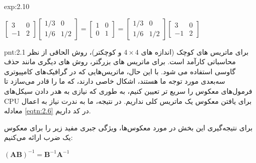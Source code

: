 {\begin{spacing}{1.5}
\begin{example}{exp:2.10}
            \begin{center}
                $\begin{bmatrix}
                     3  & 0 \\
                     -1 & 2
                \end{bmatrix}\begin{bmatrix}
                                 1/3 & 0   \\
                                 1/6 & 1/2
                \end{bmatrix}=\begin{bmatrix}
                                  1 & 0 \\
                                  0 & 1
                \end{bmatrix}=\begin{bmatrix}
                                  1/3 & 0   \\
                                  1/6 & 1/2
                \end{bmatrix}\begin{bmatrix}
                                 3  & 0 \\
                                 -1 & 2
                \end{bmatrix}$
            \end{center}
        \end{example}

        \begin{point}{pnt:2.1}
            \Large
            برای ماتریس های کوچک (اندازه های $4\times 4$ و کوچکتر)، روش الحاقی از نظر محاسباتی کارآمد است.
            برای ماتریس های بزرگتر، روش های دیگری مانند حذف گاوسی استفاده می شود.
            با این حال، ماتریس‌هایی که در گرافیک‌های کامپیوتری سه‌بعدی مورد توجه ما هستند،
            اشکال خاصی دارند، که ما را قادر می‌سازد تا فرمول‌های معکوس را سریع تر تعیین کنیم،
            به طوری که نیازی به هدر دادن سیکل‌های CPU برای یافتن معکوس یک ماتریس کلی نداریم.
            در نتیجه، ما به ندرت نیاز به اعمال معادله \ref{eqtn:2.6} در کد داریم.
        \end{point}

        برای نتیجه‌گیری این بخش در مورد معکوس‌ها، ویژگی جبری مفید زیر را برای معکوس یک ضرب ارائه می‌کنیم:

        \begin{center}
            $(\textbf{AB})^{-1}=\textbf{B}^{-1}\textbf{A}^{-1}$
        \end{center}


\end{spacing}}
